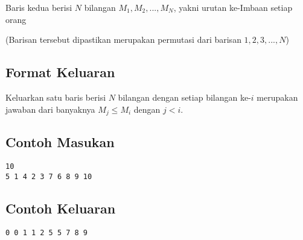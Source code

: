 \documentclass{article}
\begin{document}
Baris kedua berisi $N$ bilangan $M_1, M_2, ..., M_N$, yakni urutan ke-Imbaan setiap orang

(Barisan tersebut dipastikan merupakan permutasi dari barisan $1, 2, 3, ..., N$)

\subsection*{Format Keluaran}

Keluarkan satu baris berisi $N$ bilangan dengan setiap bilangan ke-$i$ merupakan jawaban dari banyaknya $M_j \leq M_i$ dengan $j < i$.

\begin{multicols}{2}
\subsection*{Contoh Masukan}
\begin{lstlisting}
10
5 1 4 2 3 7 6 8 9 10
\end{lstlisting}
\columnbreak
\subsection*{Contoh Keluaran}
\begin{lstlisting}
0 0 1 1 2 5 5 7 8 9
\end{lstlisting}
\vfill
\null
\end{multicols}


\pagebreak
\end{document}
